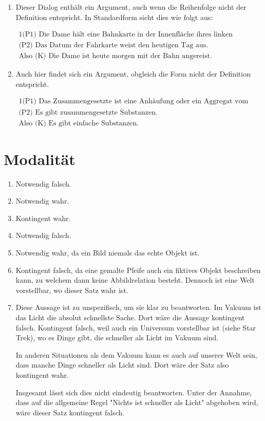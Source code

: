 \documentclass[10pt,a4paper,oneside,ngerman,numbers=noenddot]{scrartcl}
\def\thesection{\arabic{section}.}
\begin{document}
\begin{enumerate}[label=\thesection\arabic*]
    \item

Dieser Dialog enthält ein Argument, auch wenn die Reihenfolge nicht der
Definition entspricht. In Standardform sieht dies wie folgt aus:

\begin{alignat*}{1}
    \text{(P1) Die Dame hält eine Bahnkarte in der Innenfläche ihres linken Handschuhs.} \\
    \text{(P2) Das Datum der Fahrkarte weist den heutigen Tag aus.} \\
    \hline
    \text{Also (K) Die Dame ist heute morgen mit der Bahn angereist.}
\end{alignat*}

    \item

Auch hier findet sich ein Argument, obgleich die Form nicht der Definition
entspricht.

\begin{alignat*}{1}
    \text{(P1) Das Zusammengesetzte ist eine Anhäufung oder ein Aggregat vom Einfachen.} \\
    \text{(P2) Es gibt zusammengesetzte Substanzen.} \\
    \hline
    \text{Also (K) Es gibt einfache Substanzen.}
\end{alignat*}

\end{enumerate}

\section{Modalität} %

\begin{enumerate}[label=\thesection\arabic*]
    \item Notwendig falsch.
    \item Notwendig wahr.
    \item Kontingent wahr.
    \item Notwendig falsch.
    \item Notwendig wahr, da ein Bild niemals das echte Objekt ist.
    \item Kontingent falsch, da eine gemalte Pfeife auch ein fiktives Objekt beschreiben kann,
    zu welchem dann keine Abbildrelation besteht. Dennoch ist eine Welt vorstellbar,
    wo dieser Satz wahr ist.
    \item Diese Aussage ist zu unspezifisch, um sie klar zu beantworten. Im Vakuum ist
    das Licht die absolut schnellste Sache. Dort wäre die Aussage kontingent falsch.
    Kontingent falsch, weil auch ein Universum vorstellbar ist (siehe Star Trek),
    wo es Dinge gibt, die schneller als Licht im Vakuum sind.

    In anderen Situationen als dem Vakuum kann es auch auf unserer Welt sein,
    dass manche Dinge schneller als Licht sind. Dort wäre der Satz also kontingent wahr.

    Insgesamt lässt sich dies nicht eindeutig beantworten. Unter der Annahme, dass
    auf die allgemeine Regel "Nichts ist schneller als Licht" abgehoben wird,
    wäre dieser Satz kontingent falsch.
\end{enumerate}
\end{document}
